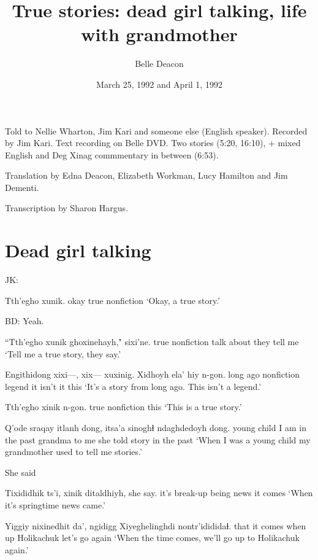 \documentclass[12pt]{article}
\begin{document}
\title{True stories: \newline dead girl talking, life with grandmother}
\author{Belle Deacon}
\date{March 25, 1992 and April 1, 1992}
\maketitle

Told to Nellie Wharton, Jim Kari and someone else (English speaker). Recorded by Jim Kari. Text recording on
Belle DVD. Two stories (5:20, 16:10), + mixed English and Deg Xinag
commmentary in between (6:53).

Translation by Edna Deacon, Elizabeth Workman, Lucy Hamilton and Jim
Dementi.

Transcription by Sharon Hargus. 

\section*{Dead girl talking}

JK:  

 Tth'egho xunik.
{okay}        true     nonfiction
\glt `Okay, a true story.'
\glend


BD:  Yeah.

\gll ``Tth'egho xunik ghoxinehayh," sixi'ne.
true     nonfiction {talk about}   {they tell me}
\glt `Tell me a true story, they say.'
\glend

\gll Engithidong {xixi---, xix---} xuxinig. Xidhoyh ela'     hiy n-gon. 
{long ago} {} nonfiction    legend {it isn't} it  this   
\glt `It's a story from long ago. This isn't a legend.'
\glend

\gll Tth'egho xinik n-gon.
true     nonfiction this
\glt `This is a true story.'
\glend

\gll Q'ode     sraqay itlanh dong, itsa'a sinoghɬ ndaghdedoyh dong.
young child  {I am} {in the past} grandma {to me} {she told story} {in the past}
\glt `When I was a young child my grandmother used to tell me stories.'
\glend

She said

\gll Tixididhik   ts'i, xinik ditaldhiyh, she say.
{it's break-up} being   news  {it comes}
\glt `When it's springtime news came.'
\glend

\gll Yiggiy nixinedhit da', ngidigg Xiyeghelinghdi nontr'idididaɬ.
that   {it comes} when   up       Holikachuk    {let's go again}
\glt `When the time comes, we'll go up to Holikachuk again.'
\glend
\end{document}
